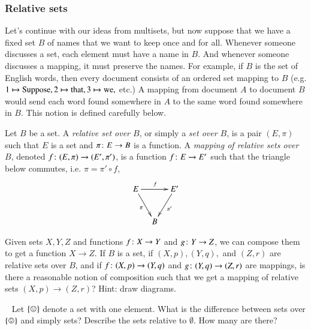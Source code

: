 
\subsubsection{Relative sets}\label{sec:relative sets}

Let's continue with our ideas from multisets, but now suppose that we have a fixed set $B$ of names that we want to keep once and for all. Whenever someone discusses a set, each element must have a name in $B$. And whenever someone discusses a mapping, it must preserve the names. For example, if $B$ is the set of English words, then every document consists of an ordered set mapping to $B$ (e.g. $1\mapsto \textrm{Suppose}, 2\mapsto\textrm{that}, 3\mapsto\textrm{we},$ etc.) A mapping from document $A$ to document $B$ would send each word found somewhere in $A$ to the same word found somewhere in $B$. This notion is defined carefully below.

\begin{definition}\label{def:relative sets}

Let $B$ be a set. A {\em relative set over $B$}, or simply a {\em set over $B$}, is a pair $(E,\pi)$ such that $E$ is a set and $\pi\colon E\rightarrow B$ is a function. A {\em mapping of relative sets over $B$}, denoted $f\colon (E,\pi)\rightarrow(E',\pi')$, is a function $f\colon E\rightarrow E'$ such that the triangle below commutes, i.e. $\pi=\pi'\circ f$,
$$
\xymatrix@=10pt{E\ar[rr]^f\ar[rdd]_{\pi}&&E'\ar[ldd]^{\pi'}\\\\&B
}
$$

\end{definition}

\begin{exercise}
Given sets $X,Y,Z$ and functions $f\colon X\rightarrow Y$ and $g\colon Y\rightarrow Z$, we can compose them to get a function $X\to Z$. If $B$ is a set, if $(X,p), (Y,q),$ and $(Z,r)$ are relative sets over $B$, and if $f\colon (X,p)\rightarrow (Y,q)$ and $g\colon (Y,q)\rightarrow (Z,r)$ are mappings, is there a reasonable notion of composition such that we get a mapping of relative sets $(X,p)\to (Z,r)$? Hint: draw diagrams.
\end{exercise}

\begin{exercise}~
\sexc Let $\singleton$ denote a set with one element. What is the difference between sets over $\singleton$ and simply sets?
\next Describe the sets relative to $\emptyset$. How many are there?
\endsexc
\end{exercise}

